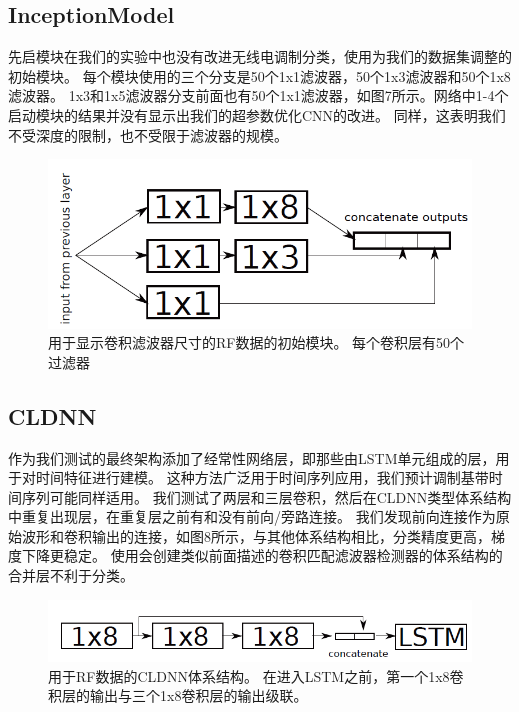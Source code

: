 \subsection{InceptionModel}
先启模块在我们的实验中也没有改进无线电调制分类，使用为我们的数据集调整的初始模块。 每个模块使用的三个分支是50个1x1滤波器，50个1x3滤波器和50个1x8滤波器。 1x3和1x5滤波器分支前面也有50个1x1滤波器，如图7所示。网络中1-4个启动模块的结果并没有显示出我们的超参数优化CNN的改进。 同样，这表明我们不受深度的限制，也不受限于滤波器的规模。\par

\begin{figure}[!h]
	\centering
	\includegraphics[scale=1]{figures/chapter_5/fig5}
	\caption{用于显示卷积滤波器尺寸的RF数据的初始模块。 每个卷积层有50个过滤器}
\end{figure}

\subsection{CLDNN}

作为我们测试的最终架构添加了经常性网络层，即那些由LSTM单元组成的层，用于对时间特征进行建模。 这种方法广泛用于时间序列应用，我们预计调制基带时间序列可能同样适用。 我们测试了两层和三层卷积，然后在CLDNN类型体系结构中重复出现层，在重复层之前有和没有前向/旁路连接。 我们发现前向连接作为原始波形和卷积输出的连接，如图8所示，与其他体系结构相比，分类精度更高，梯度下降更稳定。 使用会创建类似前面描述的卷积匹配滤波器检测器的体系结构的合并层不利于分类。\par
\begin{figure}[!h]
	\centering
	\includegraphics[scale=1]{figures/chapter_5/fig6}
	\caption{用于RF数据的CLDNN体系结构。 在进入LSTM之前，第一个1x8卷积层的输出与三个1x8卷积层的输出级联。}
\end{figure}

